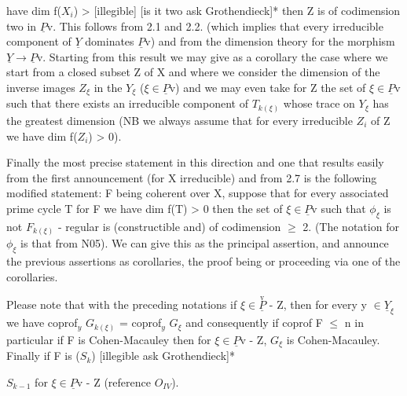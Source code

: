 
have dim f($X_{i}$) > [illegible] [is it two ask Grothendieck]* then Z
is of codimension two in $\underline{P}$v.  This follows from 2.1 and 2.2.
(which implies that every irreducible component of $\underline{Y}$ dominates $\underline{P}$v)
and from the dimension theory for the morphism $\underline{Y} \rightarrow \underline{P}$v.  Starting
from this result we may give as a corollary the case where we
start from a closed subset Z of X and where we consider the
dimension of the inverse images $Z_{\xi}$ in the $Y_{\xi}$ ($\xi \in \underline{P}$v) and we may
even take for Z the set of $\xi \in \underline{P}$v such that there exists an
irreducible component of $T_{k(\xi)}$ whose trace on $Y_{\xi}$ has the greatest
dimension (NB we always assume that for every irreducible $Z_{i}$ of Z
we have dim f($Z_{i}$) > 0).

Finally the most precise statement in this direction and one
that results easily from the first announcement (for X irreducible) and
from 2.7 is the following modified statement:  F being coherent
over X, suppose that for every associated prime cycle T for F we
have dim f(T) > 0 then the set of $\xi \in \underline{P}$v such that $\phi_{\xi}$ is not $F_{k(\xi)}$ -
regular is (constructible and) of codimension $\geq$ 2.  (The notation
for $\phi_{\xi}$ is that from N05).  We can give this as the principal
assertion, and announce the previous assertions as corollaries,
the proof being or proceeding via one of the corollaries.

Please note that with the preceding notations if $\xi \in \overset{\mathrm{v}}{\underline{P}}$ - Z,
then for every y $\in \underline{Y}_{\xi}$ we have coprof$_{y}$ $G_{k(\xi)}$ = coprof$_{y}$ $G_{\xi}$ and
consequently if coprof F $\leq$ n in particular if F is Cohen-Macauley
then for $\xi \in \underline{P}$v - Z, $G_{\xi}$ is Cohen-Macauley.  Finally if F is ($S_{k}$)
[illegible ask Grothendieck]*

$S_{k-1}$ for $\xi \in \underline{P}$v - Z (reference $O_{IV}$).

